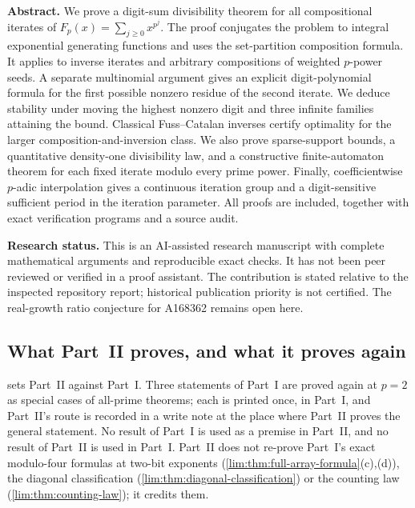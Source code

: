 \documentclass[11pt]{article}
\theoremstyle{definition}
\theoremstyle{remark}
\begin{document}
\begin{center}
\end{center}

\noindent\textbf{Abstract.}
We prove a digit-sum divisibility theorem for all compositional iterates of
$F_p(x)=\sum_{j\ge0}x^{p^j}$. The proof conjugates the problem to integral
exponential generating functions and uses the set-partition composition
formula. It applies to inverse iterates and arbitrary compositions of
weighted $p$-power seeds. A separate multinomial argument gives an explicit
digit-polynomial formula for the first possible nonzero residue of the
second iterate. We deduce stability under moving the highest nonzero digit
and three infinite families attaining the bound. Classical Fuss--Catalan
inverses certify optimality for the larger composition-and-inversion class.
We also prove sparse-support bounds, a quantitative density-one divisibility
law, and a constructive finite-automaton theorem for each fixed iterate
modulo every prime power. Finally, coefficientwise $p$-adic interpolation
gives a continuous iteration group and a digit-sensitive sufficient period
in the iteration parameter. All proofs are included, together with exact
verification programs and a source audit.

\smallskip
\noindent\textbf{Research status.}
This is an AI-assisted research manuscript with complete mathematical
arguments and reproducible exact checks. It has not been peer reviewed or
verified in a proof assistant. The contribution is stated relative to
the inspected repository report; historical publication priority is not
certified. The real-growth ratio conjecture for A168362 remains open here.

\subsection{What Part~II proves, and what it proves again}
\label{lim:dsd:sec:claims}

 sets Part~II against Part~I. Three statements of
Part~I are proved again at $p=2$ as special cases of all-prime theorems; each
is printed once, in Part~I, and Part~II's route is recorded in a write note
at the place where Part~II proves the general statement. No result of Part~I
is used as a premise in Part~II, and no result of Part~II is used in
Part~I. Part~II does not re-prove Part~I's exact modulo-four formulas at
two-bit exponents (\cref{lim:thm:full-array-formula}(c),(d)), the diagonal
classification (\cref{lim:thm:diagonal-classification}) or the counting law
(\cref{lim:thm:counting-law}); it credits them.
\end{document}
